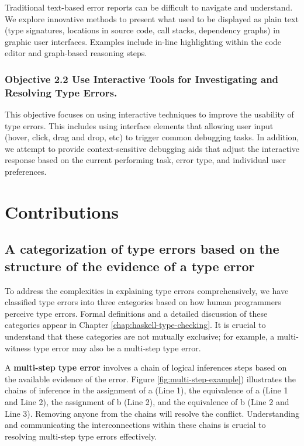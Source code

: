 Traditional text-based error reports can be difficult to navigate and understand. We explore innovative methods to present what used to be displayed as plain text (type signatures, locations in source code, call stacks, dependency graphs) in graphic user interfaces. Examples include in-line highlighting within the code editor and graph-based reasoning steps.  

\subsubsection{Objective 2.2 Use Interactive Tools for Investigating and Resolving Type Errors.}

This objective focuses on using interactive techniques to improve the usability of type errors.  This includes using interface elements that allowing user input (hover, click, drag and drop, etc) to trigger common debugging tasks. In addition, we attempt to provide context-sensitive debugging aids that adjust the interactive response based on the current performing task, error type, and individual user preferences.


\section{Contributions}

\subsection{A categorization of type errors based on the structure of the evidence of a type error}

To address the complexities in explaining type errors comprehensively, we have classified type errors into three categories based on how human programmers perceive type errors. Formal definitions and a detailed discussion of these categories appear in Chapter \ref{chap:haskell-type-checking}. It is crucial to understand that these categories are not mutually exclusive; for example, a multi-witness type error may also be a multi-step type error.

A \textbf{multi-step type error} involves a chain of logical inferences steps based on the available evidence of the error. Figure \ref{fig:multi-step-example}) illustrates the chains of inference in the assignment of a (Line 1), the equivalence of a (Line 1 and Line 2), the assignment of b (Line 2), and the equivalence of b (Line 2 and Line 3). Removing anyone from the chains will resolve the conflict. Understanding and communicating the interconnections within these chains is crucial to resolving multi-step type errors effectively.

